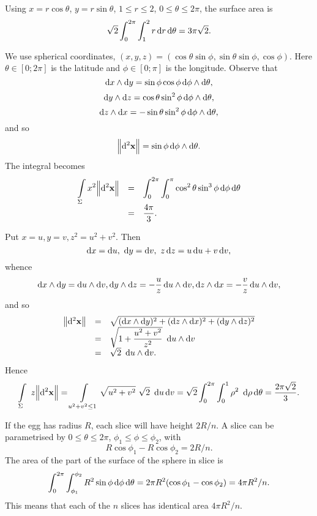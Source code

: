 \begin{Answer}{13.5}
Using $x=r\cos \theta$, $y=r\sin \theta$, $1\leq r \leq 2$, $0 \leq
\theta \leq 2\pi$, the surface area is
$$ \sqrt{2}\dint _0  ^{2\pi}\dint _1 ^2 r\d{r}\d{\theta}=3\pi\sqrt{2}.  $$
\end{Answer}
\begin{Answer}{13.6}
 We use spherical coordinates, $(x, y, z) =
(\cos\theta\sin\phi, \sin\theta\sin\phi, \cos\phi)$. Here $\theta
\in [0; 2\pi]$ is the latitude and $\phi \in [0; \pi]$ is the
longitude. Observe that
$$\d{x}\wedge\d{y}=
\sin\phi\cos\phi \d{\phi}\wedge\d{\theta} ,$$
$$\d{y}\wedge\d{z} = \cos\theta\sin^2\phi \d{\phi}\wedge\d{\theta},
$$
$$\d{z}\wedge\d{x}= -\sin\theta\sin^2\phi \d{\phi}\wedge\d{\theta},
$$and so
$$\norm{\d{ ^2 \vector{x}}} = \sin\phi \d{\phi}\wedge\d{\theta}.$$
The integral becomes
$$\begin{array}{lll}
\dint \limits_\Sigma x^2 \norm{\d{ ^2\vector{x}}} & = & \dint _0 ^{2\pi}
\dint _{0} ^{\pi} \cos^2\theta\sin^3\phi \d{\phi}  \d{\theta} \\
& = & \dfrac{4\pi}{3}.
\end{array}$$
\end{Answer}
\begin{Answer}{13.7}
 Put $x
= u, y = v, z^2 = u^2 + v^2$. Then
$$\d{x} = \d{u}, \ \d{y} = \d{v}, \ z\d{z} = u\d{u} + v\d{v},    $$
whence
$$\d{x} \wedge \d{y} =  \d{u} \wedge \d{v}, \d{y} \wedge \d{z} = -\dfrac{u}{z}  \d{u} \wedge \d{v},
\d{z} \wedge \d{x} = -\dfrac{v}{z}  \d{u} \wedge \d{v},  $$ and so
$$\begin{array}{lll}\norm{\d{ ^2\vector{x}}} & = &  \sqrt{(\d{x} \wedge \d{y})^2 + (\d{z} \wedge \d{x})^2 + (\d{y} \wedge \d{z})^2} \\
& = & \sqrt{1 + \dfrac{u^2 + v^2}{z^2}}\ \d{u}\wedge\d{v} \\ &  = &
\sqrt{2}\ \d{u}\wedge\d{v}.
\end{array}$$ Hence $$\dint \limits_{\Sigma} \ z\norm{\d{ ^2\vector{x}}} =
\dint\limits_{u^2 + v^2 \leq 1} \sqrt{u^2 + v^2}\ \sqrt{2}\
\d{u}\d{v} = \sqrt{2}\dint _0 ^{2\pi}\dint _0 ^1  \rho^2\
\d{\rho}\d{\theta} = \dfrac{2\pi\sqrt{2}}{3}.
$$
\end{Answer}
\begin{Answer}{13.8}
 If the egg
has radius $R$,  each slice will have height $2R/n$. A slice can be
parametrised by $0 \leq \theta \leq 2\pi$, $\phi_1 \leq \phi \leq
\phi_2$, with $$R\cos\phi_1 - R\cos\phi_2 = 2R/n.$$ The area of the
part of the surface of the sphere in slice is $$\dint _0
^{2\pi}\dint_{\phi_1} ^{\phi_2} R^2\sin\phi \d{\phi}\d{\theta} = 2\pi
R^2(\cos\phi_1 - \cos\phi_2 ) = 4\pi R^2/n.$$ This means that each
of the $n$ slices has identical area $4\pi R^2 /n$.
\end{Answer}
